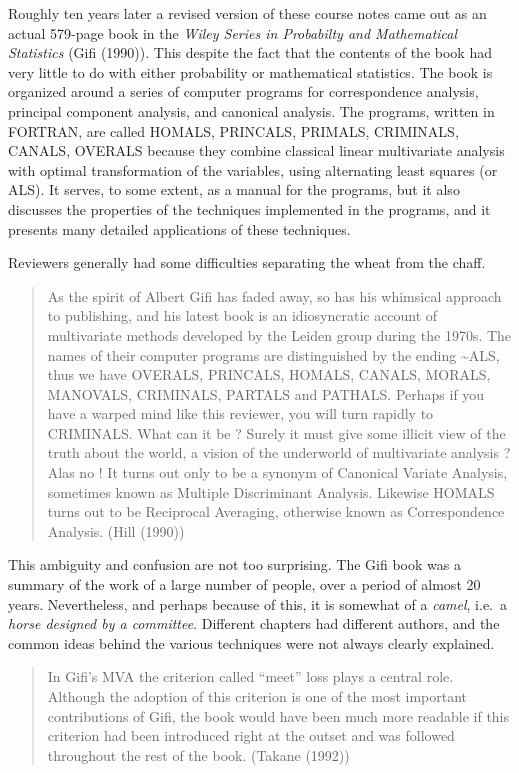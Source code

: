 \documentclass[
  12pt,
  letterpaper,
  DIV=11,
  numbers=noendperiod]{scrreprt}
\begin{document}
Roughly ten years later a revised version of these course notes came out
as an actual 579-page book in the \emph{Wiley Series in Probabilty and
Mathematical Statistics} (Gifi (1990)). This despite the fact that the
contents of the book had very little to do with either probability or
mathematical statistics. The book is organized around a series of
computer programs for correspondence analysis, principal component
analysis, and canonical analysis. The programs, written in FORTRAN, are
called HOMALS, PRINCALS, PRIMALS, CRIMINALS, CANALS, OVERALS because
they combine classical linear multivariate analysis with optimal
transformation of the variables, using alternating least squares (or
ALS). It serves, to some extent, as a manual for the programs, but it
also discusses the properties of the techniques implemented in the
programs, and it presents many detailed applications of these
techniques.

Reviewers generally had some difficulties separating the wheat from the
chaff.

\begin{quote}
As the spirit of Albert Gifi has faded away, so has his whimsical
approach to publishing, and his latest book is an idiosyncratic account
of multivariate methods developed by the Leiden group during the 1970s.
The names of their computer programs are distinguished by the ending
\textasciitilde ALS, thus we have OVERALS, PRINCALS, HOMALS, CANALS,
MORALS, MANOVALS, CRIMINALS, PARTALS and PATHALS. Perhaps if you have a
warped mind like this reviewer, you will turn rapidly to CRIMINALS. What
can it be ? Surely it must give some illicit view of the truth about the
world, a vision of the underworld of multivariate analysis ? Alas no !
It turns out only to be a synonym of Canonical Variate Analysis,
sometimes known as Multiple Discriminant Analysis. Likewise HOMALS turns
out to be Reciprocal Averaging, otherwise known as Correspondence
Analysis. (Hill (1990))
\end{quote}

This ambiguity and confusion are not too surprising. The Gifi book was a
summary of the work of a large number of people, over a period of almost
20 years. Nevertheless, and perhaps because of this, it is somewhat of a
\emph{camel}, i.e.~a \emph{horse designed by a committee}. Different
chapters had different authors, and the common ideas behind the various
techniques were not always clearly explained.

\begin{quote}
In Gifi's MVA the criterion called ``meet'' loss plays a central role.
Although the adoption of this criterion is one of the most important
contributions of Gifi, the book would have been much more readable if
this criterion had been introduced right at the outset and was followed
throughout the rest of the book. (Takane (1992))
\end{quote}
\end{document}
